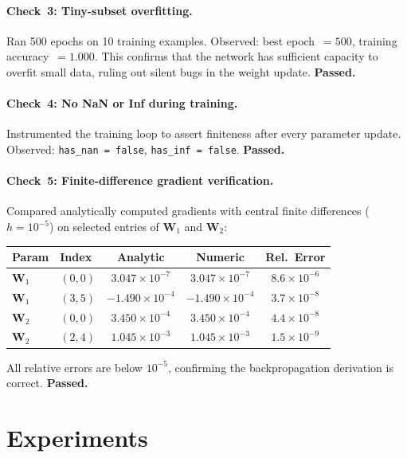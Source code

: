 \documentclass[11pt]{article}
\newcommand{\W}{\mathbf{W}}
\begin{document}
\paragraph{Check~3: Tiny-subset overfitting.}
Ran 500 epochs on 10 training examples.
Observed: best epoch~$=500$, training accuracy~$=1.000$.
This confirms that the network has sufficient capacity to overfit small data,
ruling out silent bugs in the weight update.
\textbf{Passed.}

\paragraph{Check~4: No NaN or Inf during training.}
Instrumented the training loop to assert finiteness after every parameter
update.
Observed: \texttt{has\_nan = false}, \texttt{has\_inf = false}.
\textbf{Passed.}

\paragraph{Check~5: Finite-difference gradient verification.}
Compared analytically computed gradients with central finite differences
($h=10^{-5}$) on selected entries of $\W_1$ and $\W_2$:

\begin{center}
\renewcommand{\arraystretch}{1.25}
\begin{tabular}{llccc}
\toprule
Param & Index & Analytic & Numeric & Rel.\ Error \\
\midrule
$\W_1$ & $(0,0)$ & $3.047\times10^{-7}$ & $3.047\times10^{-7}$
  & $8.6\times10^{-6}$ \\
$\W_1$ & $(3,5)$ & $-1.490\times10^{-4}$ & $-1.490\times10^{-4}$
  & $3.7\times10^{-8}$ \\
$\W_2$ & $(0,0)$ & $3.450\times10^{-4}$ & $3.450\times10^{-4}$
  & $4.4\times10^{-8}$ \\
$\W_2$ & $(2,4)$ & $1.045\times10^{-3}$ & $1.045\times10^{-3}$
  & $1.5\times10^{-9}$ \\
\bottomrule
\end{tabular}
\end{center}

All relative errors are below $10^{-5}$, confirming the backpropagation
derivation is correct.
\textbf{Passed.}

\section{Experiments}
\label{sec:experiments}
\end{document}
